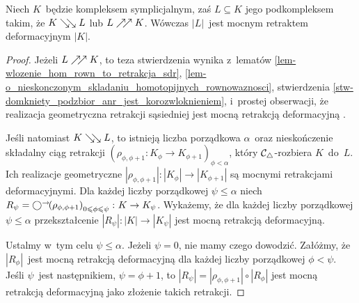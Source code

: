 \begin{stw}\label{stw-zgniatalny_jest_sciagalny}
Niech $K$~będzie kompleksem symplicjalnym, zaś $L\subseteq K$ jego podkompleksem takim, że $K\searrow\!\!\searrow L$ lub $L\nearrow\!\!\nearrow K$. Wówczas $|L|$~jest mocnym retraktem deformacyjnym $|K|$.
\end{stw}
\begin{proof}
Jeżeli $L\nearrow\!\!\nearrow K$, to teza stwierdzenia wynika z~lematów \ref{lem-wlozenie_hom_rown_to_retrakcja_sdr}, \ref{lem-o_nieskonczonym_skladaniu_homotopijnych_rownowaznosci}, stwierdzenia \ref{stw-domkniety_podzbior_anr_jest_korozwloknieniem}, i~prostej obserwacji, że realizacja geometryczna retrakcji sąsiedniej jest mocną retrakcją deformacyjną .

Jeśli natomiast $K\searrow\!\!\searrow L$, to istnieją liczba porządkowa $\alpha$~oraz nieskończenie składalny ciąg retrakcji $\left(\rho_{\phi,\phi+1}\colon K_\phi\to K_{\phi+1}\right)_{\phi<\alpha}$, który $\mathcal{C}_\triangle$-rozbiera $K$~do~$L$. Ich realizacje geometryczne $\left|\rho_{\phi,\phi+1}\right|\colon \left|K_\phi\right|\to \left|K_{\phi+1}\right|$ są mocnymi retrakcjami deformacyjnymi. Dla każdej liczby porządkowej $\psi\leq \alpha$ niech \mbox{$R_\psi=\bigcirc^\rightarrow\!\!\left(\rho_{\phi,\phi+1}\right)_{0\leqslant \phi\leqslant \psi}\colon K\to K_\psi$}.  Wykażemy, że dla każdej liczby porządkowej $\psi\leq\alpha$ przekształcenie $\left|R_\psi\right|\colon |K|\to \left|K_\psi\right|$ jest mocną retrakcją deformacyjną.

Ustalmy w~tym celu $\psi\leq\alpha$. Jeżeli $\psi=0$, nie mamy czego dowodzić. Załóżmy, że $\left|R_\phi\right|$~jest mocną retrakcją deformacyjną dla każdej liczby porządkowej $\phi<\psi$. Jeśli $\psi$~jest następnikiem, $\psi=\phi+1$, to $\left|R_\psi\right|=\left|\rho_{\phi,\phi+1}\right|\circ \left|R_\phi\right|$ jest mocną retrakcją deformacyjną jako złożenie takich retrakcji. 


\end{proof}
